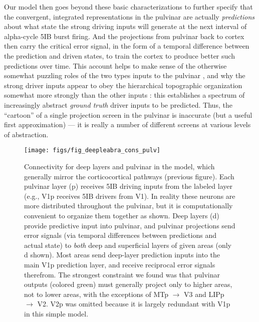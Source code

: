 \documentclass[11pt,twoside]{article}
\newif\myifpdf
\begin{document}
Our model then goes beyond these basic characterizations to further specify that the convergent, integrated representations in the pulvinar are actually {\em predictions} about what state the strong driving inputs will generate at the next interval of alpha-cycle 5IB burst firing.  And the projections from pulvinar back to cortex then carry the critical error signal, in the form of a temporal difference between the prediction and driven states, to train the cortex to produce better such predictions over time.  This account helps to make sense of the otherwise somewhat puzzling roles of the two types inputs to the pulvinar \cite{ShermanGuillery06}, and why the strong driver inputs appear to obey the hierarchical topographic organization somewhat more strongly than the other inputs \cite{Rockland98a,Rockland96}: this establishes a spectrum of increasingly abstract {\em ground truth} driver inputs to be predicted.  Thus, the ``cartoon'' of a single projection screen in the pulvinar is inaccurate (but a useful first approximation) --- it is really a number of different screens at various levels of abstraction.

\begin{figure}
  \centering\texttt{[image: figs/fig\_deepleabra\_cons\_pulv]}
  \caption{\footnotesize Connectivity for deep layers and pulvinar in the model, which generally mirror the corticocortical pathways (previous figure).  Each pulvinar layer (p) receives 5IB driving inputs from the labeled layer (e.g., V1p receives 5IB drivers from V1).  In reality these neurons are more distributed throughout the pulvinar, but it is computationally convenient to organize them together as shown.  Deep layers (d) provide predictive input into pulvinar, and pulvinar projections send error signals (via temporal differences between predictions and actual state) to {\em both} deep and superficial layers of given areas (only d shown).  Most areas send deep-layer prediction inputs into the main V1p prediction layer, and receive reciprocal error signals therefrom.  The strongest constraint we found was that pulvinar outputs (colored green) must generally project only to higher areas, not to lower areas, with the exceptions of MTp $\rightarrow$ V3 and LIPp $\rightarrow$ V2.  V2p was omitted because it is largely redundant with V1p in this simple model.}
  \label{fig.model_cons_pulv}
\end{figure}
\end{document}
